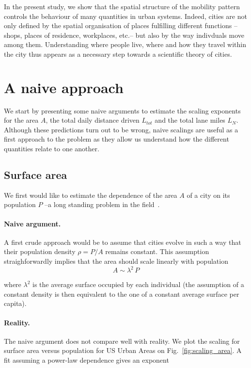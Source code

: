 In the present study, we show that the spatial structure of the mobility pattern
controls the behaviour of many quantities in urban systems. Indeed, cities are
not only defined by the spatial organisation of places fulfilling different
functions --shops, places of residence, workplaces, etc.-- but also by the way
indivduals move among them. Understanding where people live, where and how they
travel within the city thus appears as a necessary step towards a scientific
theory of cities.\\ 

\section{A naive approach}
\label{sec:elementary_understanding_of_the_scaling_relationships}

We start by presenting some naive arguments to estimate the scaling exponents
for the area $A$, the total daily distance driven $L_{tot}$ and the total lane
miles $L_N$. Although these predictions turn out to be wrong, naive scalings are
useful as a first approach to the problem as they allow us understand how the
different quantities relate to one another.

\subsection{Surface area}

We first would like to estimate the dependence of the area
$A$ of a city on its population $P$ --a long standing problem in the
field~\cite{Stewart:1947, Batty:2011}.

\paragraph{Naive argument.}  A first crude approach would be to assume
that cities evolve in such a way that their population density $\rho = P/A$
remains constant. This assumption straighforwardly implies that the area should
scale linearly with population
%
\begin{equation} 
    A \sim \lambda^2\, P 
    \label{eq:area_naive} 
\end{equation}

where $\lambda^2$ is the average surface occupied by each individual (the
assumption of a constant density is then equivalent to the one of a constant
average surface per capita).

\paragraph{Reality.} The naive argument does not compare well with reality. We
plot the scaling for surface area versus population for US Urban Areas on
Fig.~\ref{fig:scaling_area}. A fit assuming a power-law dependence gives an exponent

